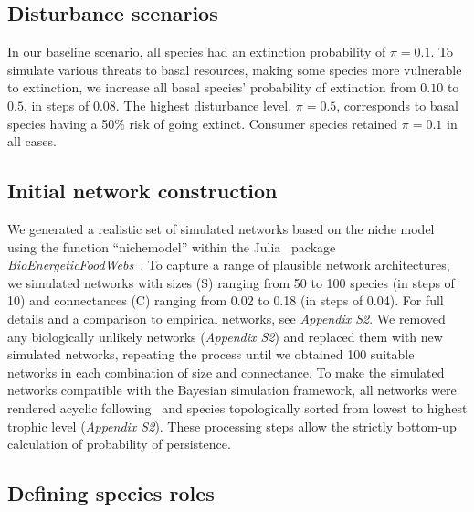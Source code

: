 \documentclass[12pt]{article}
\begin{document}
\begin{spacing}{2.0}
		
    \subsection*{Disturbance scenarios}
    
        In our baseline scenario, all species had an extinction probability of $\pi = 0.1$. 
		To simulate various threats to basal resources, making some species more vulnerable to extinction, we increase all basal species' probability of extinction from $0.10$ to $0.5$, in steps of $0.08$. 
		The highest disturbance level, $\pi = 0.5$, corresponds to basal species having a 50\% risk of going extinct. 
		Consumer species retained $\pi=0.1$ in all cases.
		
		
	\subsection*{Initial network construction}

		We generated a realistic set of simulated networks based on the niche model~\citep{Williams2000,Stouffer2007} using the function ``nichemodel'' within the Julia~\citep{Bezanson2017julia} package \emph{BioEnergeticFoodWebs}~\citep{bioenergfw,Delmas2017}. 
		To capture a range of plausible network architectures, we simulated networks with sizes (S) ranging from 50 to 100 species (in steps of 10) and connectances (C) ranging from 0.02 to 0.18 (in steps of 0.04). 
		For full details and a comparison to empirical networks, see \emph{Appendix S2}.
		We removed any biologically unlikely networks (\emph{Appendix S2}) and replaced them with new simulated networks, repeating the process until we obtained 100 suitable networks in each combination of size and connectance.
		To make the simulated networks compatible with the Bayesian simulation framework, all networks were rendered acyclic following~\citet{Allesina2009functional} and species topologically sorted from lowest to highest trophic level (\emph{Appendix S2}). 
		 These processing steps allow the strictly bottom-up calculation of probability of persistence.
		
		
	\subsection*{Defining species roles}


\end{spacing}
\end{document}
